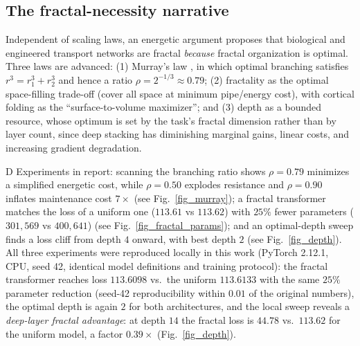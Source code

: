 \documentclass[journal]{IEEEtran}
\begin{document}
\subsection{The fractal-necessity narrative}
\label{sec:fractal-finding}
Independent of scaling laws, an energetic argument \cite{shape2026} proposes that
biological and engineered transport networks are fractal \emph{because} fractal
organization is optimal. Three laws are advanced: (1) Murray's law
\cite{murray1926}, in which optimal branching satisfies $r^3=r_1^3+r_2^3$ and
hence a ratio $\rho=2^{-1/3}\approx0.79$; (2) fractality as the optimal
space-filling trade-off (cover all space at minimum pipe/energy cost), with
cortical folding as the ``surface-to-volume maximizer''; and (3) depth as a
bounded resource, whose optimum is set by the task's fractal dimension rather
than by layer count, since deep stacking has diminishing marginal gains, linear
costs, and increasing gradient degradation.

D
Experiments in \cite{shape2026} report: scanning the branching ratio shows
$\rho=0.79$ minimizes a simplified energetic cost, while $\rho=0.50$ explodes
resistance and $\rho=0.90$ inflates maintenance cost $7\times$ (see
Fig.~\ref{fig_murray}); a fractal transformer matches the loss of a uniform one
($113.61$ vs $113.62$) with $25\%$ fewer parameters ($301{,}569$ vs $400{,}641$)
(see Fig.~\ref{fig_fractal_params}); and an optimal-depth sweep finds a loss
cliff from depth $4$ onward, with best depth $2$ (see Fig.~\ref{fig_depth}).
All three experiments were reproduced locally in this work (PyTorch 2.12.1,
CPU, seed 42, identical model definitions and training protocol): the fractal
transformer reaches loss $113.6098$ vs.\ the uniform $113.6133$ with the same
$25\%$ parameter reduction (seed-42 reproducibility within $0.01$ of the
original numbers), the optimal depth is again $2$ for both architectures, and
the local sweep reveals a \emph{deep-layer fractal advantage}: at depth $14$
the fractal loss is $44.78$ vs.\ $113.62$ for the uniform model, a factor
$0.39\times$ (Fig.~\ref{fig_depth}).
\end{document}
